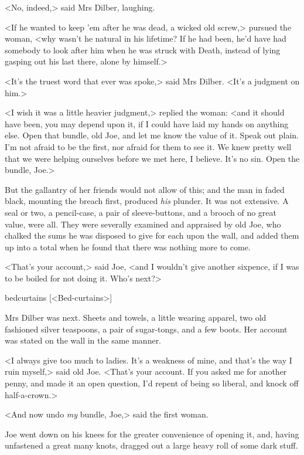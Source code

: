 <No, indeed,> said Mrs Dilber, laughing.

<If he wanted to keep 'em after he was dead, a wicked old screw,> pursued the
woman, <why wasn't he natural in his lifetime? If he had been, he'd have had
somebody to look after him when he was struck with Death, instead of lying
gasping out his last there, alone by himself.>

<It's the truest word that ever was spoke,> said Mrs Dilber. <It's a judgment on
him.>

<I wish it was a little heavier judgment,> replied the woman: <and it should
have been, you may depend upon it, if I could have laid my hands on anything
else. Open that bundle, old Joe, and let me know the value of it. Speak out
plain. I'm not afraid to be the first, nor afraid for them to see it. We knew
pretty well that we were helping ourselves before we met here, I believe. It's
no sin. Open the bundle, Joe.>

But the gallantry of her friends would not allow of this; and the man in faded
black, mounting the breach first, produced \emph{his} plunder. It was not
extensive. A seal or two, a pencil-case, a pair of sleeve-buttons, and a brooch
of no great value, were all. They were severally examined and appraised by old
Joe, who chalked the sums he was disposed to give for each upon the wall, and
added them up into a total when he found that there was nothing more to come.

<That's your account,> said Joe, <and I wouldn't give another sixpence, if I was
to be boiled for not doing it. Who's next?>

  \begin{colorbigpic}
    [\basicscale] 
    {bedcurtains}
    [<Bed-curtains>]  
  \end{colorbigpic}


Mrs Dilber was next. Sheets and towels, a little wearing apparel, two old
fashioned silver teaspoons, a pair of sugar-tongs, and a few boots. Her account
was stated on the wall in the same manner.

<I always give too much to ladies. It's a weakness of mine, and that's the way I
ruin myself,> said old Joe. <That's your account. If you asked me for another
penny, and made it an open question, I'd repent of being so liberal, and knock
off half-a-crown.>

<And now undo \emph{my} bundle, Joe,> said the first woman.

Joe went down on his knees for the greater convenience of opening it, and,
having unfastened a great many knots, dragged out a large heavy roll of some
dark stuff.

